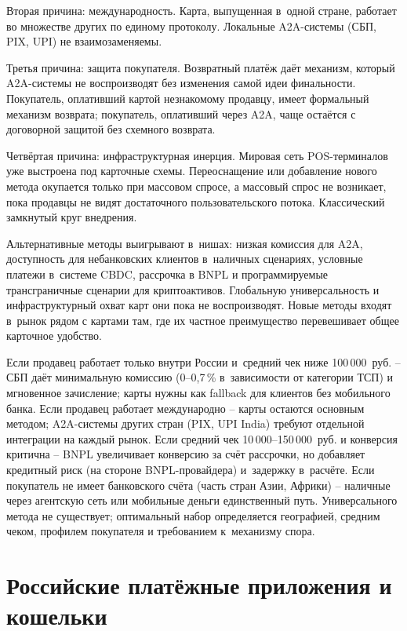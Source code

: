 Вторая причина: международность. Карта, выпущенная в~одной стране,
работает во множестве других по единому протоколу. Локальные
A2A-системы (СБП, PIX, UPI) не взаимозаменяемы.

Третья причина: защита покупателя. Возвратный платёж даёт механизм, который
A2A-системы не воспроизводят без изменения самой идеи финальности.
Покупатель, оплативший картой незнакомому продавцу, имеет формальный
механизм возврата; покупатель, оплативший через A2A, чаще остаётся с
договорной защитой без схемного возврата.

Четвёртая причина: инфраструктурная инерция. Мировая сеть
POS-терминалов уже выстроена под карточные схемы. Переоснащение
или добавление нового метода окупается только при массовом спросе, а
массовый спрос не возникает, пока продавцы не видят достаточного
пользовательского потока. Классический замкнутый круг внедрения.

Альтернативные методы выигрывают в~нишах: низкая комиссия для
A2A, доступность для небанковских клиентов в~наличных сценариях,
условные платежи в~системе CBDC, рассрочка в BNPL и программируемые
трансграничные сценарии для криптоактивов. Глобальную
универсальность и инфраструктурный охват карт они пока не
воспроизводят. Новые методы входят в~рынок рядом с
картами там, где их частное преимущество
перевешивает общее карточное удобство.

Если продавец работает только внутри России и~средний
чек ниже 100\,000~руб. -- СБП даёт минимальную комиссию
(0--0,7\,\% в~зависимости от категории ТСП) и мгновенное зачисление; карты нужны
как fallback для клиентов без мобильного банка.
Если продавец работает международно -- карты остаются основным
методом; A2A-системы других стран (PIX, UPI India) требуют
отдельной интеграции на каждый рынок. Если средний чек
10\,000--150\,000~руб. и конверсия критична -- BNPL увеличивает
конверсию за счёт рассрочки, но добавляет кредитный риск
(на стороне BNPL-провайдера) и~задержку в~расчёте. Если
покупатель не имеет банковского счёта (часть стран Азии,
Африки) -- наличные через агентскую сеть или мобильные
деньги единственный путь. Универсального метода
не существует; оптимальный набор определяется географией,
средним чеком, профилем покупателя и требованием
к~механизму спора.

\section{Российские платёжные приложения и кошельки}\label{sec:alt-russia-wallets}


